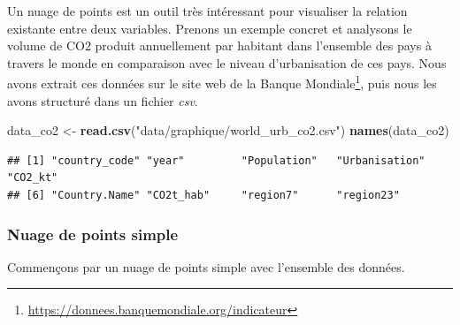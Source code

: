 \documentclass[
  11pt,
  french,
]{book}
\makeatletter
\newenvironment{Shaded}{\begin{snugshade}}{\end{snugshade}}
\newcommand{\DataTypeTok}[1]{\textcolor[rgb]{0.13,0.29,0.53}{#1}}
\newcommand{\KeywordTok}[1]{\textcolor[rgb]{0.13,0.29,0.53}{\textbf{#1}}}
\newcommand{\NormalTok}[1]{#1}
\newcommand{\OperatorTok}[1]{\textcolor[rgb]{0.81,0.36,0.00}{\textbf{#1}}}
\newcommand{\StringTok}[1]{\textcolor[rgb]{0.31,0.60,0.02}{#1}}
\renewcommand{\href}[2]{#2\footnote{\url{#1}}}
\newenvironment{kframe}{%
\medskip{}
\setlength{\fboxsep}{.8em}
 \def\at@end@of@kframe{}%
 \ifinner\ifhmode%
  \def\at@end@of@kframe{\end{minipage}}%
  \begin{minipage}{\columnwidth}%
 \fi\fi%
 \def\FrameCommand##1{\hskip\@totalleftmargin \hskip-\fboxsep
 \colorbox{shadecolor}{##1}\hskip-\fboxsep
     \hskip-\linewidth \hskip-\@totalleftmargin \hskip\columnwidth}%
 \MakeFramed {\advance\hsize-\width
   \@totalleftmargin\z@ \linewidth\hsize
   \@setminipage}}%
 {\par\unskip\endMakeFramed%
 \at@end@of@kframe}
\renewenvironment{Shaded}{\begin{kframe}}{\end{kframe}}
\makeatother
\begin{document}
Un nuage de points est un outil très intéressant pour visualiser la relation existante entre deux variables. Prenons un exemple concret et analysons le volume de CO2 produit annuellement par habitant dans l'ensemble des pays à travers le monde en comparaison avec le niveau d'urbanisation de ces pays. Nous avons extrait ces données sur le site web de la \href{https://donnees.banquemondiale.org/indicateur}{Banque Mondiale}, puis nous les avons structuré dans un fichier \emph{csv}.

\begin{Shaded}
\begin{Highlighting}[]
\NormalTok{data_co2 <-}\StringTok{ }\KeywordTok{read.csv}\NormalTok{(}\StringTok{"data/graphique/world_urb_co2.csv"}\NormalTok{)}
\KeywordTok{names}\NormalTok{(data_co2)}
\end{Highlighting}
\end{Shaded}

\begin{verbatim}
## [1] "country_code" "year"         "Population"   "Urbanisation" "CO2_kt"      
## [6] "Country.Name" "CO2t_hab"     "region7"      "region23"
\end{verbatim}

\hypertarget{sect03231}{%
\subsubsection{Nuage de points simple}\label{sect03231}}

Commençons par un nuage de points simple avec l'ensemble des données.

\begin{Shaded}
\end{Shaded}
\end{document}

